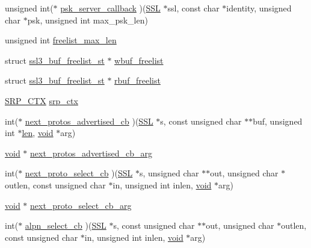 \begin{DoxyCompactItemize}
unsigned int($\ast$ \hyperlink{structssl__ctx__st_add4c613e3361a1ec0167149c336ea84d}{psk\+\_\+server\+\_\+callback} )(\hyperlink{crypto_2ossl__typ_8h_a71f21e09bf365489dab9d85bd4785e24}{S\+SL} $\ast$ssl, const char $\ast$identity, unsigned char $\ast$psk, unsigned int max\+\_\+psk\+\_\+len)
\item 
unsigned int \hyperlink{structssl__ctx__st_ae28a83432cb40d9eaaf092fa352a7d55}{freelist\+\_\+max\+\_\+len}
\item 
struct \hyperlink{structssl3__buf__freelist__st}{ssl3\+\_\+buf\+\_\+freelist\+\_\+st} $\ast$ \hyperlink{structssl__ctx__st_a670ba9bd5c510cd59c87d4f4ac422377}{wbuf\+\_\+freelist}
\item 
struct \hyperlink{structssl3__buf__freelist__st}{ssl3\+\_\+buf\+\_\+freelist\+\_\+st} $\ast$ \hyperlink{structssl__ctx__st_a5adb764f28839f3d62dff9c1212a55b2}{rbuf\+\_\+freelist}
\item 
\hyperlink{include_2openssl_2ssl_8h_aed13ca5c0b6c032c4fb830dea5e80b55}{S\+R\+P\+\_\+\+C\+TX} \hyperlink{structssl__ctx__st_ad3a544f7f1590f59a020f91dbd13ee09}{srp\+\_\+ctx}
\item 
int($\ast$ \hyperlink{structssl__ctx__st_a787a303e9d0bb9531d6a73cb05812c68}{next\+\_\+protos\+\_\+advertised\+\_\+cb} )(\hyperlink{crypto_2ossl__typ_8h_a71f21e09bf365489dab9d85bd4785e24}{S\+SL} $\ast$s, const unsigned char $\ast$$\ast$buf, unsigned int $\ast$\hyperlink{include_2openssl_2x509_8h_ad8c3db4434e9cb5cd772cc009f40e856}{len}, \hyperlink{hw__4758__cca_8h_afad4d591c7931ff6dc5bf69c76c96aa0}{void} $\ast$arg)
\item 
\hyperlink{hw__4758__cca_8h_afad4d591c7931ff6dc5bf69c76c96aa0}{void} $\ast$ \hyperlink{structssl__ctx__st_ab31e2b0b3e8338b7130dd85f1c15cbe1}{next\+\_\+protos\+\_\+advertised\+\_\+cb\+\_\+arg}
\item 
int($\ast$ \hyperlink{structssl__ctx__st_abaf00647cd8e47465b90a593daf9c487}{next\+\_\+proto\+\_\+select\+\_\+cb} )(\hyperlink{crypto_2ossl__typ_8h_a71f21e09bf365489dab9d85bd4785e24}{S\+SL} $\ast$s, unsigned char $\ast$$\ast$out, unsigned char $\ast$outlen, const unsigned char $\ast$in, unsigned int inlen, \hyperlink{hw__4758__cca_8h_afad4d591c7931ff6dc5bf69c76c96aa0}{void} $\ast$arg)
\item 
\hyperlink{hw__4758__cca_8h_afad4d591c7931ff6dc5bf69c76c96aa0}{void} $\ast$ \hyperlink{structssl__ctx__st_a9a763a6b990ff57b3b1168d7241995f4}{next\+\_\+proto\+\_\+select\+\_\+cb\+\_\+arg}
\item 
int($\ast$ \hyperlink{structssl__ctx__st_a65abf4d526978169dd0891e9e22f1aa1}{alpn\+\_\+select\+\_\+cb} )(\hyperlink{crypto_2ossl__typ_8h_a71f21e09bf365489dab9d85bd4785e24}{S\+SL} $\ast$s, const unsigned char $\ast$$\ast$out, unsigned char $\ast$outlen, const unsigned char $\ast$in, unsigned int inlen, \hyperlink{hw__4758__cca_8h_afad4d591c7931ff6dc5bf69c76c96aa0}{void} $\ast$arg)
$$
\end{DoxyCompactItemize}

